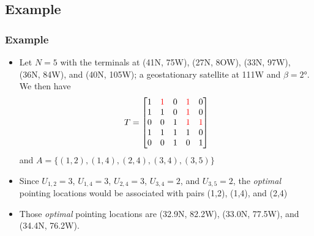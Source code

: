 \documentclass[aspectratio=169]{beamer}
\begin{document}
\subsection{Example}
\begin{frame}
\frametitle{Example\footnotemark}
\begin{itemize}
\item Let $N=5$ with the terminals at (41N, 75W), (27N, 8OW), (33N, 97W), (36N, 84W), and (40N, 105W); a geostationary satellite at 111W and $\beta = \ang{2}$.  We then have 
\[
T = \begin{bmatrix}
1 & \textcolor{red}{1} & 0 & \textcolor{red}{1} & 0 \\
1 & 1 & 0 & \textcolor{red}{1} & 0 \\
0 & 0 & 1 & \textcolor{red}{1} & \textcolor{red}{1} \\
1 & 1 & 1 & 1 & 0 \\
0 & 0 & 1 & 0 & 1 
\end{bmatrix}
\]
and $A = \{(1,2),(1,4),(2,4),(3,4),(3,5)\}$
\item Since $U_{1,2}=3$, $U_{1,4}=3$, $U_{2,4}=3$, $U_{3,4}=2$, and $U_{3,5}=2$, the {\em optimal} pointing locations would be associated with pairs (1,2), (1,4), and (2,4)
\item Those {\em optimal} pointing locations are (32.9N, 82.2W), (33.0N, 77.5W), and (34.4N, 76.2W).
\end{itemize}

\end{frame}
\end{document}
